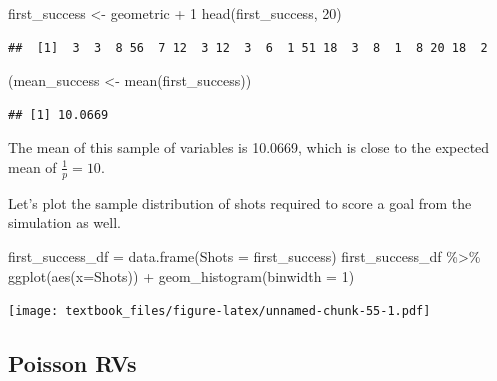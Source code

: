\documentclass[
  11pt,
]{book}
\newenvironment{Shaded}{\begin{snugshade}}{\end{snugshade}}
\newcommand{\AttributeTok}[1]{\textcolor[rgb]{0.77,0.63,0.00}{#1}}
\newcommand{\DecValTok}[1]{\textcolor[rgb]{0.00,0.00,0.81}{#1}}
\newcommand{\FunctionTok}[1]{\textcolor[rgb]{0.00,0.00,0.00}{#1}}
\newcommand{\NormalTok}[1]{#1}
\newcommand{\OtherTok}[1]{\textcolor[rgb]{0.56,0.35,0.01}{#1}}
\newcommand{\SpecialCharTok}[1]{\textcolor[rgb]{0.00,0.00,0.00}{#1}}
\theoremstyle{definition}
\theoremstyle{definition}
\theoremstyle{definition}
\theoremstyle{definition}
\theoremstyle{remark}
\begin{document}
\begin{Shaded}
\begin{Highlighting}[]
\NormalTok{first\_success }\OtherTok{\textless{}{-}}\NormalTok{ geometric }\SpecialCharTok{+} \DecValTok{1}
\FunctionTok{head}\NormalTok{(first\_success, }\DecValTok{20}\NormalTok{)}
\end{Highlighting}
\end{Shaded}

\begin{verbatim}
##  [1]  3  3  8 56  7 12  3 12  3  6  1 51 18  3  8  1  8 20 18  2
\end{verbatim}

\begin{Shaded}
\begin{Highlighting}[]
\NormalTok{(mean\_success }\OtherTok{\textless{}{-}} \FunctionTok{mean}\NormalTok{(first\_success))}
\end{Highlighting}
\end{Shaded}

\begin{verbatim}
## [1] 10.0669
\end{verbatim}

The mean of this sample of variables is 10.0669, which is close to the expected mean of \(\frac{1}{p} = 10\).

Let's plot the sample distribution of shots required to score a goal from the simulation as well.

\begin{Shaded}
\begin{Highlighting}[]
\NormalTok{first\_success\_df }\OtherTok{=} \FunctionTok{data.frame}\NormalTok{(}\AttributeTok{Shots =}\NormalTok{ first\_success)}
\NormalTok{first\_success\_df }\SpecialCharTok{\%\textgreater{}\%} \FunctionTok{ggplot}\NormalTok{(}\FunctionTok{aes}\NormalTok{(}\AttributeTok{x=}\NormalTok{Shots)) }\SpecialCharTok{+} \FunctionTok{geom\_histogram}\NormalTok{(}\AttributeTok{binwidth =} \DecValTok{1}\NormalTok{)}
\end{Highlighting}
\end{Shaded}

\texttt{[image: textbook\_files/figure-latex/unnamed-chunk-55-1.pdf]}

\newpage

\hypertarget{poisson-rvs}{%
\subsection{Poisson RVs}\label{poisson-rvs}}
\end{document}
